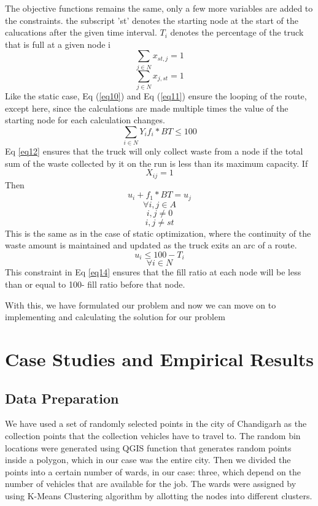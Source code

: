 \documentclass[12pt]{article}
\begin{document}
The objective functions remains the same, only a few more variables are added to the constraints. the subscript 'st' denotes the starting node at the start of the calucations after the given time interval. $T_i$ denotes the percentage of the truck that is full at a given node i
\begin{equation}\label{eq10}
    \sum_{j\in N}x_{st,j}=1
\end{equation}
\begin{equation}\label{eq11}
    \sum_{j\in N}x_{j,st}=1
\end{equation}
Like the static case, Eq (\ref{eq10}) and Eq (\ref{eq11}) ensure the looping of the route, except here, since the calculations are made multiple times the value of the starting node for each calculation changes.
\begin{equation}\label{eq12}
    \sum_{i\in N}Y_i f_i* BT\le100
\end{equation}
Eq \eqref{eq12} ensures that the truck will only collect waste from a node if the total sum of the waste collected by it on the run is less than its maximum capacity.
If
$$X_{ij}=1$$
Then
\begin{equation}\label{eq13}
    u_i+f_1*BT=u_j
\end{equation}
$$\forall i,j\in A$$
$$i,j\ne 0 $$
$$ i,j \ne st $$
This is the same as in the case of static optimization, where the continuity of the waste amount is maintained and updated as the truck exits an arc of a route.
\begin{equation}\label{eq14}
    u_i\le 100 - T_i
\end{equation}
$$\forall i \in N $$
This constraint in Eq \eqref{eq14} ensures that the fill ratio at each node will be less than or equal to 100- fill ratio before that node.

With this, we have formulated our problem and now we can move on to implementing and calculating the solution for our problem

\section{Case Studies and Empirical Results}

\subsection{Data Preparation}

We have used a set of randomly selected points in the city of Chandigarh as the collection points that the collection vehicles have to travel to. The random bin locations were generated using QGIS function that generates random points inside a polygon, which in our case was the entire city. Then we divided the points into a certain number of wards, in our case: three, which depend on the number of vehicles that are available for the job. The wards were assigned by using K-Means Clustering algorithm by allotting the nodes into different clusters.
\end{document}
